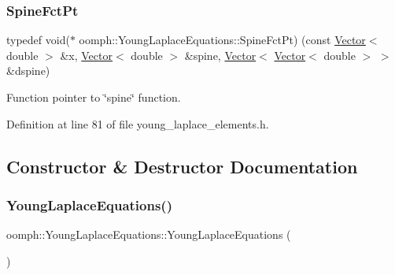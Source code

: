 \mbox{\label{classoomph_1_1YoungLaplaceEquations_a97448cfb2f6361e986d363d9e4463f9f}} 
\subsubsection{\texorpdfstring{Spine\+Fct\+Pt}{SpineFctPt}}
{\footnotesize\ttfamily typedef void($\ast$ oomph\+::\+Young\+Laplace\+Equations\+::\+Spine\+Fct\+Pt) (const \hyperlink{classoomph_1_1Vector}{Vector}$<$ double $>$ \&x, \hyperlink{classoomph_1_1Vector}{Vector}$<$ double $>$ \&spine, \hyperlink{classoomph_1_1Vector}{Vector}$<$ \hyperlink{classoomph_1_1Vector}{Vector}$<$ double $>$ $>$ \&dspine)}



Function pointer to \char`\"{}spine\char`\"{} function. 



Definition at line 81 of file young\+\_\+laplace\+\_\+elements.\+h.



\subsection{Constructor \& Destructor Documentation}
\mbox{\label{classoomph_1_1YoungLaplaceEquations_a9f5e39e8fc4bc59789193c23247e67bd}} 
\subsubsection{\texorpdfstring{Young\+Laplace\+Equations()}{YoungLaplaceEquations()}\hspace{0.1cm}{\footnotesize\ttfamily [1/2]}}
{\footnotesize\ttfamily oomph\+::\+Young\+Laplace\+Equations\+::\+Young\+Laplace\+Equations (\begin{DoxyParamCaption}{ }\end{DoxyParamCaption})\hspace{0.3cm}{\ttfamily [inline]}}


